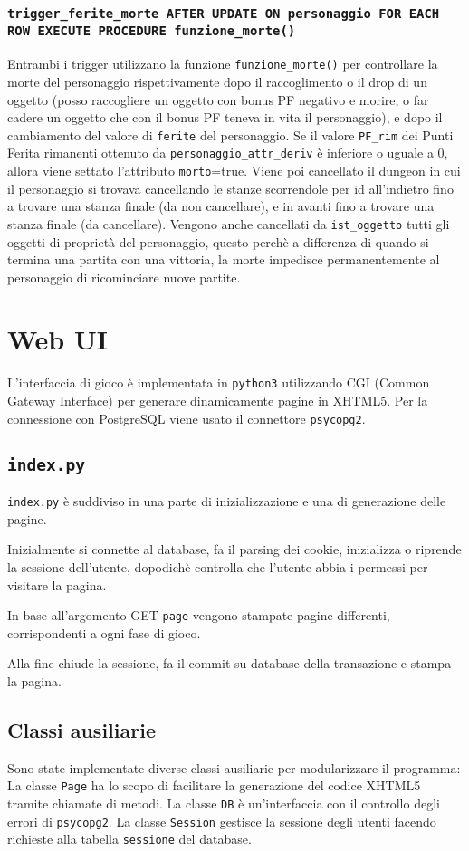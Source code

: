 \documentclass[10pt,a4paper]{article}
\begin{document}
\subsubsection{\texttt{trigger\_ferite\_morte AFTER UPDATE ON personaggio FOR EACH ROW EXECUTE PROCEDURE funzione\_morte()}}
Entrambi i trigger utilizzano la funzione \texttt{funzione\_morte()} per controllare la morte del personaggio rispettivamente dopo il raccoglimento o il drop di un oggetto (posso raccogliere un oggetto con bonus PF negativo e morire, o far cadere un oggetto che con il bonus PF teneva in vita il personaggio), e dopo il cambiamento del valore di \texttt{ferite} del personaggio. Se il valore \texttt{PF\_rim} dei Punti Ferita rimanenti ottenuto da \texttt{personaggio\_attr\_deriv} è inferiore o uguale a 0, allora viene settato l'attributo \texttt{morto}=true. Viene poi cancellato il dungeon in cui il personaggio si trovava cancellando le stanze scorrendole per id all'indietro fino a trovare una stanza finale (da non cancellare), e in avanti fino a trovare una stanza finale (da cancellare). Vengono anche cancellati da \texttt{ist\_oggetto} tutti gli oggetti di proprietà del personaggio, questo perchè a differenza di quando si termina una partita con una vittoria, la morte impedisce permanentemente al personaggio di ricominciare nuove partite.

\newpage 

\section{Web UI}
L'interfaccia di gioco è implementata in \texttt{python3} utilizzando CGI (Common Gateway Interface) per generare dinamicamente pagine in XHTML5. Per la connessione con PostgreSQL viene usato il connettore \texttt{psycopg2}.

\subsection{\texttt{index.py}}
\texttt{index.py} è suddiviso in una parte di inizializzazione e una di generazione delle pagine.

Inizialmente si connette al database, fa il parsing dei cookie, inizializza o riprende la sessione dell'utente, dopodichè controlla che l'utente abbia i permessi per visitare la pagina.

In base all'argomento GET \texttt{page} vengono stampate pagine differenti, corrispondenti a ogni fase di gioco.

Alla fine chiude la sessione, fa il commit su database della transazione e stampa la pagina.

\subsection{Classi ausiliarie}
Sono state implementate diverse classi ausiliarie per modularizzare il programma:
La classe \texttt{Page} ha lo scopo di facilitare la generazione del codice XHTML5 tramite chiamate di metodi. La classe \texttt{DB} è un'interfaccia con il controllo degli errori di \texttt{psycopg2}. La classe \texttt{Session} gestisce la sessione degli utenti facendo richieste alla tabella \texttt{sessione} del database.
\end{document}

